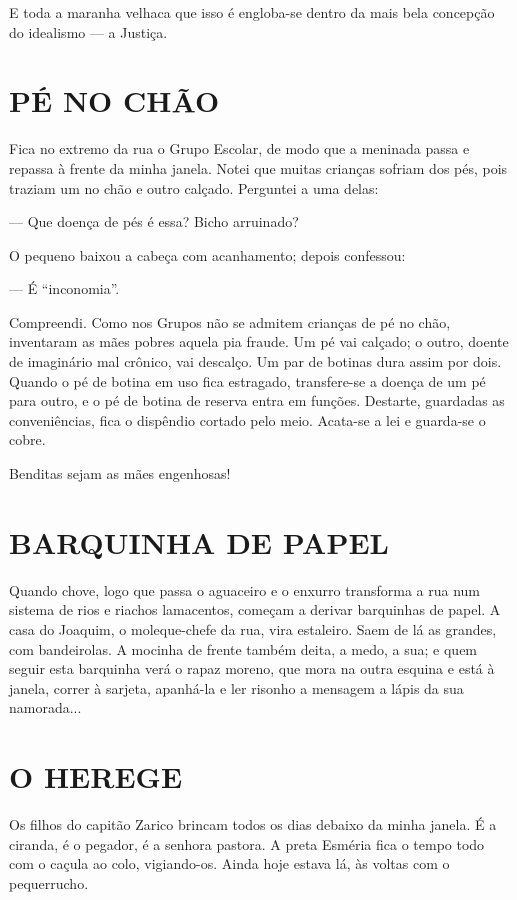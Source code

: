 E toda a maranha velhaca que isso é engloba-se dentro da mais bela
concepção do idealismo --- a Justiça.

\section{PÉ NO CHÃO}

Fica no extremo da rua o Grupo Escolar, de modo que a meninada passa e
repassa à frente da minha janela. Notei que muitas crianças sofriam dos
pés, pois traziam um no chão e outro calçado. Perguntei a uma delas:

--- Que doença de pés é essa? Bicho arruinado?

O pequeno baixou a cabeça com acanhamento; depois confessou:

--- É ``inconomia''.

Compreendi. Como nos Grupos não se admitem crianças de pé no chão,
inventaram as mães pobres aquela pia fraude. Um pé vai calçado; o outro,
doente de imaginário mal crônico, vai descalço. Um par de botinas dura
assim por dois. Quando o pé de botina em uso fica estragado,
transfere-se a doença de um pé para outro, e o pé de botina de reserva
entra em funções. Destarte, guardadas as conveniências, fica o dispêndio
cortado pelo meio. Acata-se a lei e guarda-se o cobre.

Benditas sejam as mães engenhosas!

\section{BARQUINHA DE PAPEL}

Quando chove, logo que passa o aguaceiro e o enxurro transforma a rua
num sistema de rios e riachos lamacentos, começam a derivar barquinhas
de papel. A casa do Joaquim, o moleque-chefe da rua, vira estaleiro.
Saem de lá as grandes, com bandeirolas. A mocinha de frente também
deita, a medo, a sua; e quem seguir esta barquinha verá o rapaz moreno,
que mora na outra esquina e está à janela, correr à sarjeta, apanhá-la e
ler risonho a mensagem a lápis da sua namorada...

\section{O HEREGE}

Os filhos do capitão Zarico brincam todos os dias debaixo da minha
janela. É a ciranda, é o pegador, é a senhora pastora. A preta Esméria
fica o tempo todo com o caçula ao colo, vigiando-os. Ainda hoje estava
lá, às voltas com o pequerrucho.

